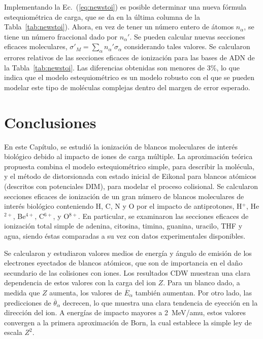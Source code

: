 Implementando la Ec.~(\ref{eq:newstoi}) es posible determinar una nueva 
fórmula estequiométrica de carga, que se da en la última columna de 
la Tabla~\ref{tab:newstoi}). Ahora, en vez de tener un número entero de 
átomos $n_{\alpha}$, se tiene un número fraccional dado por 
$n_{\alpha}'$. Se pueden calcular nuevas secciones eficaces moleculares, 
$\sigma'_{M}=\sum_{\alpha}n_{\alpha}'\sigma_{\alpha}$ considerando tales 
valores. Se calcularon errores relativos de las secciones eficaces de 
ionización para las bases de ADN de la Tabla~\ref{tab:newstoi}. Las 
diferencias obtenidas son menores de 3\%, lo que indica que el modelo 
estequiométrico es un modelo robusto con el que se pueden modelar 
este tipo de moléculas complejas dentro del margen de error esperado.

\section{Conclusiones}

En este Capítulo, se estudió la ionización de blancos moleculares de 
interés biológico debido al impacto de iones de carga múltiple. La 
aproximación teórica propuesta combina el modelo estequiométrico simple, 
para describir la molécula, y el método de distorsionada con estado 
inicial de Eikonal para blancos atómicos (descritos con potenciales 
DIM), para modelar el proceso colisional. Se calcularon secciones 
eficaces de ionización de un gran número de blancos moleculares de 
interés biológico conteniendo H, C, N y O por el impacto de 
antiprotones, H$^{+}$, He$^{2+}$, Be$^{4+}$, C$^{6+}$, y O$^{8+}$. 
En particular, se examinaron las secciones eficaces de ionización total 
simple de adenina, citosina, timina, guanina, uracilo, THF y agua, 
siendo éstas comparadas a su vez con datos experimentales disponibles. 

Se calcularon y estudiaron valores medios de energía y ángulo de emisión 
de los electrones eyectados de blancos atómicos, que son de importancia 
en el daño secundario de las colisiones con iones. Los resultados CDW
muestran una clara dependencia de estos valores con la carga del ion 
$Z$. Para un blanco dado, a medida que $Z$ aumenta, los valores de
$\overline{E}_{\alpha}$ también aumentan. Por otro lado, las 
predicciones de $\overline{\theta}_{\alpha}$ decrecen, lo que muestra 
una clara tendencia de eyección en la dirección del ion. A energías de 
impacto mayores a 2~MeV/amu, estos valores convergen a la primera 
aproximación de Born, la cual establece la simple ley de escala $Z^{2}$. 

